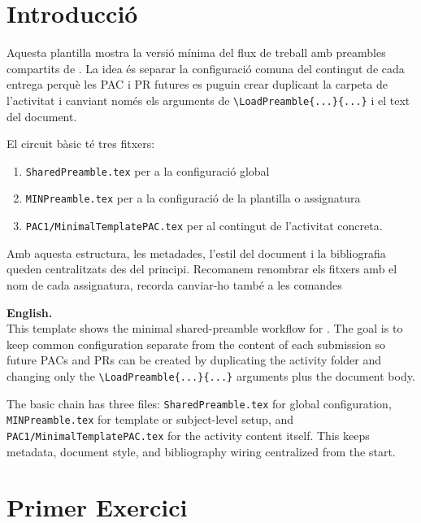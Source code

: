 
	\section*{ Introducció }
		Aquesta plantilla mostra la versió mínima del flux de treball amb preambles compartits de \PECTeX. La idea és separar la configuració comuna del contingut de cada entrega perquè les PAC i PR futures es puguin crear duplicant la carpeta de l'activitat i canviant només els arguments de \verb|\LoadPreamble{...}{...}| i el text del document.

		El circuit bàsic té tres fitxers:
		\begin{enumerate}
			\item \texttt{SharedPreamble.tex} per a la configuració global
			\item \texttt{MINPreamble.tex} per a la configuració de la plantilla o assignatura
			\item \texttt{PAC1/MinimalTemplatePAC.tex} per al contingut de l'activitat concreta.
		\end{enumerate}
			Amb aquesta estructura, les metadades, l'estil del document i la bibliografia queden centralitzats des del principi. Recomanem renombrar els fitxers amb el nom de cada assignatura, recorda canviar-ho també a les comandes \verb||

		\par\bigskip
		\textbf{English.}\\ This template shows the minimal shared-preamble workflow for \PECTeX. The goal is to keep common configuration separate from the content of each submission so future PACs and PRs can be created by duplicating the activity folder and changing only the \verb|\LoadPreamble{...}{...}| arguments plus the document body.

		The basic chain has three files: \texttt{SharedPreamble.tex} for global configuration, \texttt{MINPreamble.tex} for template or subject-level setup, and \texttt{PAC1/MinimalTemplatePAC.tex} for the activity content itself. This keeps metadata, document style, and bibliography wiring centralized from the start.
	\section[Exercici 1]{Primer Exercici}
